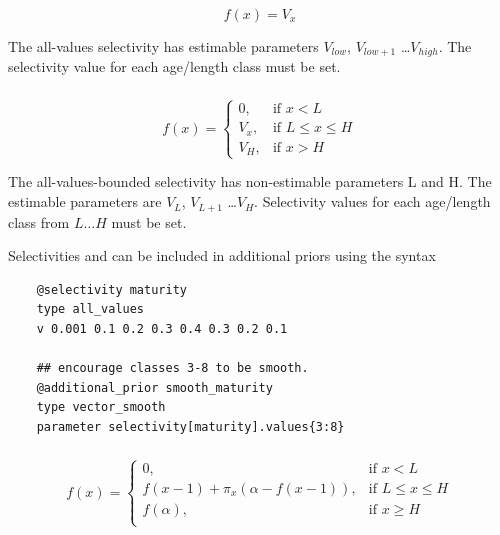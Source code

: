 \begin{equation}
f(x)=V_x
\end{equation}

The all-values selectivity has estimable parameters $V_{low}$, $V_{low+1}$ \ldots $V_{high}$. The selectivity value for each age/length class must be set.

\subsubsection[All values bounded]{}  \label{sec:Selectivity-AllValuesBounded}

\begin{equation}
f(x)=\begin{cases}
	0, & \text{if $x < L$} \\
	V_x, & \text{if $L \le x \le H$} \\
	V_H, & \text{if $x > H$}
\end{cases}
\end{equation}

The all-values-bounded selectivity has non-estimable parameters L and H. The estimable parameters are $V_L$, $V_{L+1}$ \ldots $V_H$. Selectivity values for each age/length class from $L \ldots H$ must be set.

Selectivities  and  can be included in additional priors using the syntax

{\small{\begin{verbatim}
	@selectivity maturity
	type all_values
	v 0.001 0.1 0.2 0.3 0.4 0.3 0.2 0.1

	## encourage classes 3-8 to be smooth.
	@additional_prior smooth_maturity
	type vector_smooth
	parameter selectivity[maturity].values{3:8}
\end{verbatim}}}

\subsubsection[Increasing]{} \label{sec:Selectivity-Increasing}

\begin{equation}
f(x)=\begin{cases}
	0, & \text{if $x < L$} \\
	f(x-1)+ \pi_x(\alpha-f(x-1)), & \text{if $L \le x \le H$} \\
	f(\alpha), & \text{if $x \ge H$} \\
\end{cases}
\end{equation}


